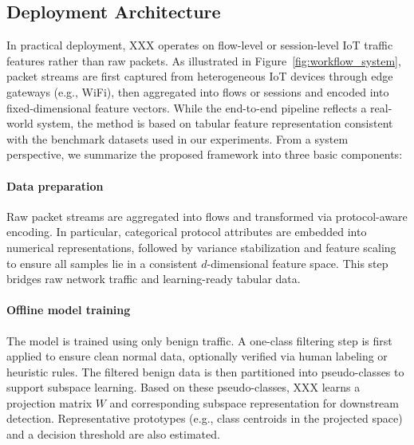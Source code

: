 \documentclass[final,twocolumn,10pt]{elsarticle}
\begin{document}


\subsection{Deployment Architecture}
\label{subsec:deployment_workflow} 

In practical deployment, XXX operates on flow-level or session-level IoT traffic features rather than raw packets. As illustrated in Figure~\ref{fig:workflow_system}, packet streams are first captured from heterogeneous IoT devices through edge gateways (e.g., WiFi), then aggregated into flows or sessions and encoded into fixed-dimensional feature vectors. While the end-to-end pipeline reflects a real-world system, the method is based on tabular feature representation consistent with the benchmark datasets used in our experiments. From a system perspective, we summarize the proposed framework into three basic components:


\paragraph{Data preparation}
Raw packet streams are aggregated into flows and transformed via protocol-aware encoding. In particular, categorical protocol attributes are embedded into numerical representations, followed by variance stabilization and feature scaling to ensure all samples lie in a consistent \(d\)-dimensional feature space. This step bridges raw network traffic and learning-ready tabular data.

\paragraph{Offline model training}
The model is trained using only benign traffic. A one-class filtering step is first applied to ensure clean normal data, optionally verified via human labeling or heuristic rules. The filtered benign data is then partitioned into pseudo-classes to support subspace learning. Based on these pseudo-classes, XXX learns a projection matrix \(W\) and corresponding subspace representation for downstream detection. Representative prototypes (e.g., class centroids in the projected space) and a decision threshold are also estimated.
\end{document}
